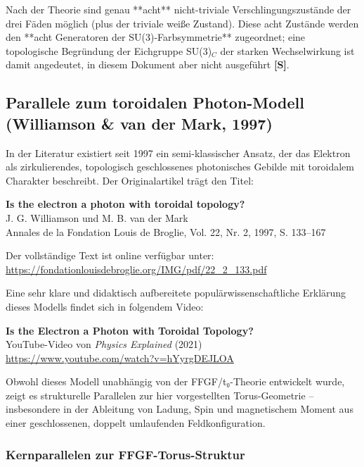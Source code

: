 	Nach der Theorie sind genau **acht** nicht-triviale Verschlingungszustände der drei Fäden möglich (plus der triviale weiße Zustand). Diese acht Zustände werden den **acht Generatoren der SU(3)-Farbsymmetrie** zugeordnet; eine topologische Begründung der Eichgruppe SU(3)$_C$ der starken Wechselwirkung ist damit angedeutet, in diesem Dokument aber nicht ausgeführt \textbf{[S]}.
	
	\subsection{Parallele zum toroidalen Photon-Modell (Williamson \& van der Mark, 1997)}
	
	In der Literatur existiert seit 1997 ein semi-klassischer Ansatz, der das Elektron als zirkulierendes, topologisch geschlossenes photonisches Gebilde mit toroidalem Charakter beschreibt. Der Originalartikel trägt den Titel:
	
	\begin{center}
		\textbf{Is the electron a photon with toroidal topology?} \\
		J. G. Williamson und M. B. van der Mark \\
		Annales de la Fondation Louis de Broglie, Vol. 22, Nr. 2, 1997, S. 133--167
	\end{center}
	
	Der vollständige Text ist online verfügbar unter: \\
	\url{https://fondationlouisdebroglie.org/IMG/pdf/22_2_133.pdf}
	
	Eine sehr klare und didaktisch aufbereitete populärwissenschaftliche Erklärung dieses Modells findet sich in folgendem Video:
	
	\begin{center}
		\textbf{Is the Electron a Photon with Toroidal Topology?} \\
		YouTube-Video von \emph{Physics Explained} (2021) \\
		\url{https://www.youtube.com/watch?v=hYyrgDEJLOA}
	\end{center}
	
	Obwohl dieses Modell unabhängig von der FFGF/t₀-Theorie entwickelt wurde, zeigt es strukturelle Parallelen zur hier vorgestellten Torus-Geometrie – insbesondere in der Ableitung von Ladung, Spin und magnetischem Moment aus einer geschlossenen, doppelt umlaufenden Feldkonfiguration.
	
	\subsubsection{Kernparallelen zur FFGF-Torus-Struktur}
	
